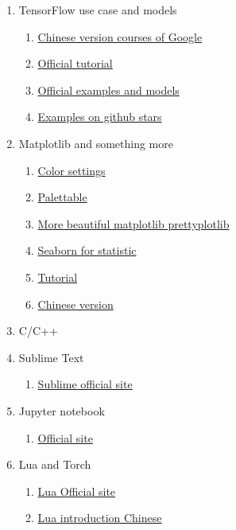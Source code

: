 \documentclass[12pt, a4paper]{article}
\begin{document}
\begin{enumerate}
  \item TensorFlow use case and models
    \begin{enumerate}
      \item \href{https://developers.google.cn/machine-learning/crash-course/}{Chinese version courses of Google}
      \item \href{https://www.tensorflow.org/}{Official tutorial}
      \item \href{https://github.com/tensorflow/models}{Official examples and models}
      \item \href{https://github.com/taki0112}{Examples on github stars}
    \end{enumerate}
  \item Matplotlib and something more
    \begin{enumerate}
      \item \href{http://colorbrewer2.org/}{Color settings}
      \item \href{https://github.com/jiffyclub/palettable}{Palettable}
      \item \href{https://github.com/olgabot/prettyplotlib}{More beautiful matplotlib prettyplotlib}
      \item \href{https://github.com/mwaskom/seaborn}{Seaborn for statistic}
      \item \href{http://www.labri.fr/perso/nrougier/teaching/matplotlib/}{Tutorial}
      \item \href {http://reverland.org/python/2012/09/07/matplotlib-tutorial/}{Chinese version}
    \end{enumerate}
  \item C/C++
  \item Sublime Text
    \begin{enumerate}
      \item \href{http://www.sublimetext.com/}{Sublime official site}
    \end{enumerate}
  \item Jupyter notebook
    \begin{enumerate}
      \item \href{https://jupyter.org/}{Official site}
    \end{enumerate}
  \item Lua and Torch
    \begin{enumerate}
      \item \href{https://www.lua.org/}{Lua Official site}
      \item \href{http://www.runoob.com/lua/lua-tutorial.html}{Lua introduction Chinese}

\end{enumerate}
\end{enumerate}
\end{document}
